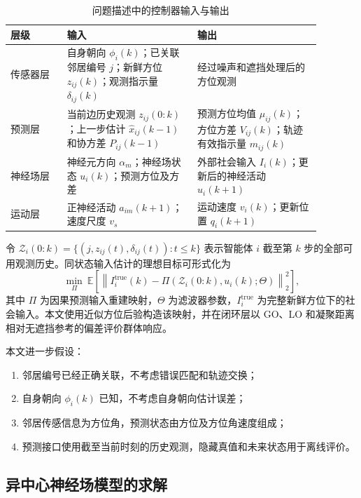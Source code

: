 \documentclass[UTF8,fontset=windows,11pt]{ctexart}
\begin{document}
\begin{table}[H]
 \centering
 \small
 \caption{问题描述中的控制器输入与输出}
 \label{tab:problem_io}
 \begin{tabular}{>{\raggedright\arraybackslash}p{0.16\linewidth}
                 >{\raggedright\arraybackslash}p{0.37\linewidth}
                 >{\raggedright\arraybackslash}p{0.35\linewidth}}
 \toprule
 层级 & 输入 & 输出\\
 \midrule
 传感器层 &
 自身朝向 $\phi_i(k)$；已关联邻居编号 $j$；新鲜方位 $z_{ij}(k)$；观测指示量 $\delta_{ij}(k)$ &
 经过噪声和遮挡处理后的方位观测\\
 预测层 &
 当前边历史观测 $z_{ij}(0:k)$；上一步估计 $\hat x_{ij}(k-1)$ 和协方差 $P_{ij}(k-1)$ &
 预测方位均值 $\mu_{ij}(k)$；方位方差 $V_{ij}(k)$；轨迹有效指示量 $m_{ij}(k)$\\
 神经场层 &
 神经元方向 $\alpha_m$；神经场状态 $u_i(k)$；预测方位及方差 &
 外部社会输入 $I_i(k)$；更新后的神经活动 $u_i(k+1)$\\
 运动层 &
 正神经活动 $a_{im}(k+1)$；速度尺度 $v_s$ &
 运动速度 $v_i(k)$；更新位置 $q_i(k+1)$\\
 \bottomrule
 \end{tabular}
\end{table}

令 $\mathcal Z_i(0:k)=\{(j,z_{ij}(t),\delta_{ij}(t)):t\le k\}$ 表示智能体 $i$ 截至第 $k$ 步的全部可用观测历史。同状态输入估计的理想目标可形式化为
\begin{equation}
 \min_{\Pi}\ \mathbb E\left[
 \left\|I_i^{\mathrm{true}}(k)-\Pi(\mathcal Z_i(0:k),u_i(k);\Theta)\right\|_2^2
 \right],
\end{equation}
其中 $\Pi$ 为因果预测输入重建映射，$\Theta$ 为滤波器参数，$I_i^{\mathrm{true}}$ 为完整新鲜方位下的社会输入。本文使用近似方位后验构造该映射，并在闭环层以 GO、LO 和凝聚距离相对无遮挡参考的偏差评价群体响应。

本文进一步假设：

\begin{enumerate}[label=(\arabic*)]
 \item 邻居编号已经正确关联，不考虑错误匹配和轨迹交换；
 \item 自身朝向 $\phi_i(k)$ 已知，不考虑自身朝向估计误差；
 \item 邻居传感信息为方位角，预测状态由方位及方位角速度组成；
 \item 预测接口使用截至当前时刻的历史观测，隐藏真值和未来状态用于离线评价。
\end{enumerate}

\subsection{异中心神经场模型的求解}\label{sec:neural_model}
\end{document}
